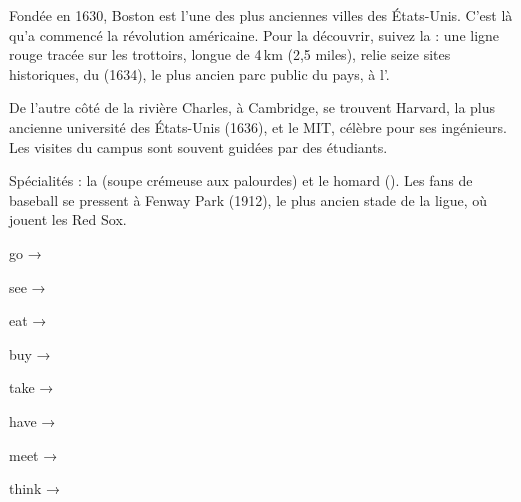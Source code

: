 
\begin{culture}
Fondée en 1630, Boston est l'une des plus anciennes villes des États-Unis. C'est là qu'a commencé la
révolution américaine. Pour la découvrir, suivez la  : une ligne rouge tracée sur
les trottoirs, longue de 4\,km (2,5 miles), relie seize sites historiques, du  (1634),
le plus ancien parc public du pays, à l'.
\end{culture}

\begin{paire}
\begin{culture}
De l'autre côté de la rivière Charles, à Cambridge, se trouvent Harvard, la plus ancienne université
des États-Unis (1636), et le MIT, célèbre pour ses ingénieurs. Les visites du campus sont souvent
guidées par des étudiants.
\end{culture}
\begin{culture}
Spécialités : la  (soupe crémeuse aux palourdes) et le homard (). Les fans
de baseball se pressent à Fenway Park (1912), le plus ancien stade de la ligue, où jouent les Red Sox.
\end{culture}
\end{paire}


\begin{anglais}
\begin{questions}[4]
\item go → 
\item see → 
\item eat → 
\item buy → 
\item take → 
\item have → 
\item meet → 
\item think → 
\end{questions}
\end{anglais}

